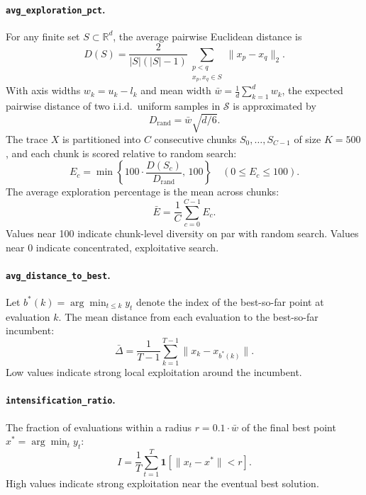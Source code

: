 \paragraph{\texttt{avg\_exploration\_pct}.}
For any finite set $S \subset \mathbb{R}^d$, the average pairwise Euclidean distance is
\begin{equation}
\label{eq:pairwise_dist}
  D(S) = \frac{2}{|S|(|S|-1)} \sum_{\substack{p < q \\ x_p, x_q \in S}} \lVert x_p - x_q \rVert_2.
\end{equation}
With axis widths $w_k = u_k - l_k$ and mean width $\bar{w} = \frac{1}{d}\sum_{k=1}^d w_k$, the expected pairwise distance of two i.i.d.\ uniform samples in $\mathcal{S}$ is approximated by
\begin{equation}
\label{eq:rand_div}
  D_{\mathrm{rand}} = \bar{w} \sqrt{d/6}.
\end{equation}
The trace $X$ is partitioned into $C$ consecutive chunks $S_0, \ldots, S_{C-1}$ of size $K = 500$, and each chunk is scored relative to random search:
\begin{equation}
\label{eq:chunk_exploration}
  E_c = \min\!\left\{100 \cdot \frac{D(S_c)}{D_{\mathrm{rand}}},\, 100\right\} \quad (0 \le E_c \le 100).
\end{equation}
The average exploration percentage is the mean across chunks:
\begin{equation}
\label{eq:avg_expl_pct}
  \bar{E} = \frac{1}{C} \sum_{c=0}^{C-1} E_c.
\end{equation}
Values near 100 indicate chunk-level diversity on par with random search. Values near 0 indicate concentrated, exploitative search.

\paragraph{\texttt{avg\_distance\_to\_best}.}
Let $b^*(k) = \arg\min_{t \le k} y_t$ denote the index of the best-so-far point at evaluation $k$. The mean distance from each evaluation to the best-so-far incumbent:
\begin{equation}
\label{eq:avg_dist_best}
  \bar{\Delta} = \frac{1}{T-1} \sum_{k=1}^{T-1} \lVert x_k - x_{b^*(k)} \rVert.
\end{equation}
Low values indicate strong local exploitation around the incumbent.

\paragraph{\texttt{intensification\_ratio}.}
The fraction of evaluations within a radius $r = 0.1 \cdot \bar{w}$ of the final best point $x^* = \arg\min_{t} y_t$:
\begin{equation}
\label{eq:intensification}
  I = \frac{1}{T} \sum_{t=1}^{T} \mathbf{1}\!\left[\lVert x_t - x^* \rVert < r\right].
\end{equation}
High values indicate strong exploitation near the eventual best solution.

